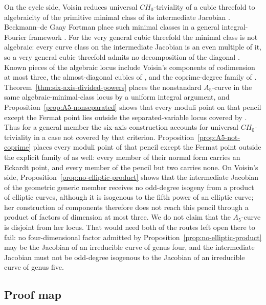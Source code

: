 On the cycle side, Voisin reduces universal \(CH_0\)-triviality of a cubic
threefold to algebraicity of the primitive minimal class of its intermediate
Jacobian \cite{Voisin}.  Beckmann--de Gaay Fortman place such minimal
classes in a general integral-Fourier framework \cite{BdGF}.  For the very
general cubic threefold the minimal class is not algebraic: every curve
class on the intermediate Jacobian is an even multiple of it, so a very
general cubic threefold admits no decomposition of the diagonal
\cite[Theorem~1.3 and Corollary~1.4]{EdGFS}.  Known pieces of the algebraic
locus include Voisin's components of codimension at most three, the
almost-diagonal cubics of \cite{CT}, and the coprime-degree family of
\cite{YYZ}.  Theorem~\ref{thm:six-axis-divided-powers} places the
nonstandard \(A_5\)-curve in the same algebraic-minimal-class locus by a
uniform integral argument, and
Proposition~\ref{prop:A5-nonseparated} shows that every moduli point on that
pencil except the Fermat point lies outside the separated-variable locus
covered by \cite{CT}.  Thus for a general member the six-axis construction
accounts for universal \(CH_0\)-triviality in a case not covered by that
criterion.  Proposition~\ref{prop:A5-not-coprime} places every moduli point of
that pencil except the Fermat point outside the explicit family of
\cite[Theorem~3.3]{YYZ} as well: every member of their normal form carries an
Eckardt point, and every member of the pencil but two carries none.  On Voisin's
side, Proposition~\ref{prop:no-elliptic-product} shows that the intermediate
Jacobian of the geometric generic member receives no odd-degree isogeny from a
product of elliptic curves, although it is isogenous to the fifth power of an
elliptic curve; her construction of components therefore does not reach this
pencil through a product of factors of dimension at most three.  We do not
claim that the \(A_5\)-curve is disjoint from her locus.  That would need both
of the routes left open there to fail: no four-dimensional factor admitted by
Proposition~\ref{prop:no-elliptic-product} may be the Jacobian of an
irreducible curve of genus four, and the intermediate Jacobian must not be
odd-degree isogenous to the Jacobian of an irreducible curve of genus five.

\subsection*{Proof map}

